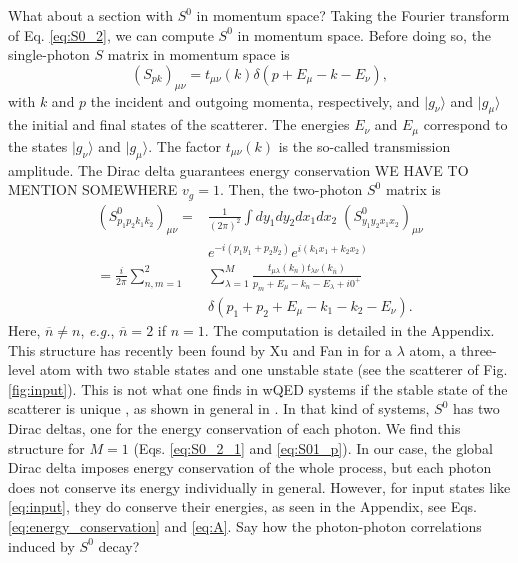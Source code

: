 \documentclass[aps,pra,reprint,amsmath,amssymb]{revtex4-1}
\begin{document}
{\color{blue}What about a section with $S^0$ in momentum space?} Taking the Fourier transform of Eq. \eqref{eq:S0_2}, we can compute $S^0$ in momentum space. Before doing so, the single-photon $S$ matrix in momentum space is
\begin{equation}\label{eq:S01_p}
(S_{pk})_{\mu\nu}=t_{\mu\nu}(k)\delta(p+E_\mu-k-E_\nu),
\end{equation}
with $k$ and $p$ the incident and outgoing momenta, respectively, and $|g_\nu\rangle$ and $|g_\mu\rangle$ the initial and final states of the scatterer. The energies $E_\nu$ and $E_\mu$ correspond to the states $|g_\nu\rangle$ and $|g_\mu\rangle$. The factor $t_{\mu\nu}(k)$ is the so-called transmission amplitude. The Dirac delta guarantees energy conservation {\color{blue}WE HAVE TO MENTION SOMEWHERE $v_g=1$}. Then, the two-photon $S^0$ matrix is
\begin{align}\label{eq:S0_2p}
(S_{p_1p_2k_1k_2}^0)_{\mu\nu}=&\frac{1}{(2\pi)^2}\int  dy_1dy_2dx_1dx_2\; (S_{y_1y_2x_1x_2}^0)_{\mu\nu}\nonumber\\
& e^{-i(p_1y_1+p_2y_2)}  e^{i(k_1x_1+k_2x_2)} \nonumber\\
=  \frac{i}{2\pi}\sum_{n,m=1}^2 &\sum_{\lambda=1}^M  \frac{t_{\mu\lambda}(k_n) t_{\lambda\nu}(k_{\overline{n}})}{p_m+E_\mu -k_n -E_\lambda + i0^+}\nonumber\\
&\delta(p_1+p_2+E_\mu - k_1-k_2-E_\nu).
\end{align}
Here, $\overline{n}\neq n$, \emph{e.g.}, $\overline{n}=2$ if $n=1$. The computation is detailed in the Appendix. This structure has recently been found by Xu and Fan in \cite{Xu2016} for a $\lambda$ atom, a three-level atom with two stable states and one unstable state (see the scatterer of Fig. \ref{fig:input}). This is not what one finds in wQED systems if the stable state of the scatterer is unique \cite{Fan2010,Rephaeli2011,Sanchez-Burillo2016b}, as shown in general in \cite{Xu2013}. In that kind of systems, $S^0$ has two Dirac deltas, one for the energy conservation of each photon. We find this structure for $M=1$ (Eqs. \eqref{eq:S0_2_1} and \eqref{eq:S01_p}). In our case, the global Dirac delta imposes energy conservation of the whole process, but each photon does not conserve its energy individually in general. However, for input states like \eqref{eq:input}, they do conserve their energies, as seen in the Appendix, see Eqs. \eqref{eq:energy_conservation} and \eqref{eq:A}. {\color{blue}Say how the photon-photon correlations induced by $S^0$ decay?} %
\end{document}
